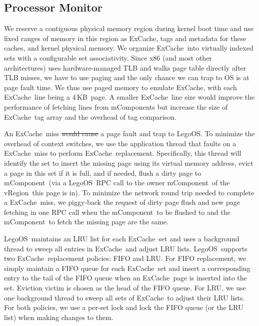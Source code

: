 \documentclass[10pt,times,twocolumn]{z2-article}
\renewcommand{\em}{\it}
\newcommand{\KB}{\,KB}
\newcommand{\lego}{LegoOS}
\newcommand{\excache}{ExCache}
\newcommand{\vicache}{VtmCache}
\newcommand{\vregion}{vRegion}
\newcommand{\mcomponent}{mComponent}
\providecommand{\DIFaddtex}[1]{{\protect\color{blue}\uwave{#1}}} %
\providecommand{\DIFdeltex}[1]{{\protect\color{red}\sout{#1}}}                      %
\providecommand{\DIFaddbegin}{} %
\providecommand{\DIFaddend}{} %
\providecommand{\DIFdelbegin}{} %
\providecommand{\DIFdelend}{} %
\providecommand{\DIFadd}[1]{\texorpdfstring{\DIFaddtex{#1}}{#1}} %
\providecommand{\DIFdel}[1]{\texorpdfstring{\DIFdeltex{#1}}{}} %
\newcommand{\DIFscaledelfig}{0.5}
\newlength{\DIFdelgraphicswidth} %
\newlength{\DIFdelgraphicsheight} %
\newcommand{\DIFaddincludegraphics}[2][]{{\color{blue}\fbox{\DIFOincludegraphics[#1]{#2}}}} %
\newcommand{\DIFdelincludegraphics}[2][]{%
\sbox{\DIFdelgraphicsbox}{\DIFOincludegraphics[#1]{#2}}%
\settoboxwidth{\DIFdelgraphicswidth}{\DIFdelgraphicsbox} %
\settoboxtotalheight{\DIFdelgraphicsheight}{\DIFdelgraphicsbox} %
\scalebox{\DIFscaledelfig}{%
\parbox[b]{\DIFdelgraphicswidth}{\usebox{\DIFdelgraphicsbox}\\[-\baselineskip] \rule{\DIFdelgraphicswidth}{0em}}\llap{\resizebox{\DIFdelgraphicswidth}{\DIFdelgraphicsheight}{%
\setlength{\unitlength}{\DIFdelgraphicswidth}%
\begin{picture}(1,1)%
\thicklines\linethickness{2pt} %
{\color[rgb]{1,0,0}\put(0,0){\framebox(1,1){}}}%
{\color[rgb]{1,0,0}\put(0,0){\line( 1,1){1}}}%
{\color[rgb]{1,0,0}\put(0,1){\line(1,-1){1}}}%
\end{picture}%
}\hspace*{3pt}}} %
} %
\DeclareRobustCommand{\DIFaddbegin}{\DIFOaddbegin \let\includegraphics\DIFaddincludegraphics} %
\DeclareRobustCommand{\DIFaddend}{\DIFOaddend \let\includegraphics\DIFOincludegraphics} %
\DeclareRobustCommand{\DIFdelbegin}{\DIFOdelbegin \let\includegraphics\DIFdelincludegraphics} %
\DeclareRobustCommand{\DIFdelend}{\DIFOaddend \let\includegraphics\DIFOincludegraphics} %
\begin{document}
{{{{{{{\subsection{Processor Monitor}
\label{sec:procimpl}

We reserve a contiguous physical memory region during kernel boot time
and use fixed ranges of memory in this region as \excache, tags and metadata for these caches, and kernel physical memory. 
We organize \excache\ into virtually indexed sets with a configurable set associativity.
Since x86 (and most other architectures) uses hardware-managed TLB and walks page table directly after TLB misses, 
we have to use paging and the only chance we can trap to OS is at page fault time. 
We thus use paged memory to emulate \excache, 
with each \excache\ line being a 4\KB\ page.
A smaller \excache\ line size would improve the performance of fetching lines from \mcomponent{}s
but increase the size of \excache\ tag array and the overhead of tag comparison. 

An \excache\ miss \DIFdelbegin \DIFdel{would cause }\DIFdelend \DIFaddbegin \DIFadd{causes }\DIFaddend a page fault and trap to \lego.
To minimize the overhead of context switches,
we use the application thread that faults on a \excache\ miss
to perform \excache\ replacement.
Specifically, this thread will identify the set to insert the missing page
using its virtual memory address,
evict a page in this set if it is full,
and if needed, flush a dirty page to \mcomponent\ 
(via a \lego\ RPC call to the owner \mcomponent\ of the \vregion\ this page is in).
To minimize the network round trip needed to complete a \excache\ miss,
we piggy-back the request of dirty page flush and new page fetching
in one RPC call when the \mcomponent\ to be flushed to and the \mcomponent\ to fetch the missing page are the same.

\lego\ maintains an \DIFaddbegin \DIFadd{approximate }\DIFaddend LRU list for each \excache\ set 
and uses a background thread to sweep all entries in \excache\ and adjust LRU lists.
\lego\ supports two \excache\ replacement policies:
FIFO and LRU. For FIFO replacement, we simply maintain a FIFO queue for each \excache\ set and insert a
corresponding entry to the tail of the FIFO queue when
an \excache\ page is inserted into the set. Eviction victim is chosen as the head of the FIFO queue. 
For LRU, we use one background thread to sweep all sets of \excache\ to adjust their LRU lists.
For both policies, we use a per-set lock and lock the FIFO queue (or the LRU list) when
making changes to them.

}}}}}}}
\end{document}
